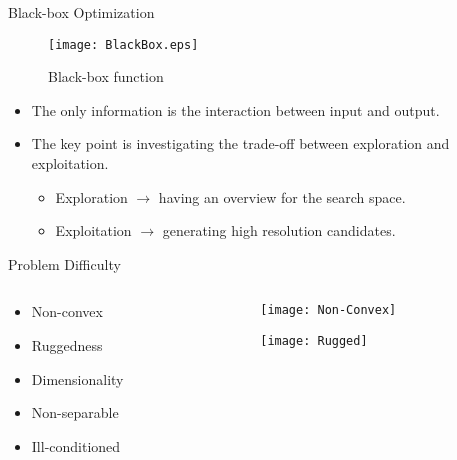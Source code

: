 \begin{frame}{Black-box Optimization}

  \begin{figure}[h]
    \texttt{[image: BlackBox.eps]}
    \caption{Black-box function}  
  \end{figure}
  \begin{itemize}
    \item The only information is the interaction between input and
    output.  
  \item The key point is investigating the trade-off between
    \alert{exploration}
    and \alert{exploitation}.
    \begin{itemize}
      \item Exploration $\rightarrow$ having an overview for the search
        space.
  \item Exploitation $\rightarrow$ generating high resolution
    candidates. 
    \end{itemize}
  \end{itemize}

\end{frame}
\begin{frame}{Problem Difficulty}
  \begin{columns}
    \begin{column}{0.7\textwidth}
      \begin{itemize}
        \item Non-convex
        \item Ruggedness
        \item Dimensionality
        \item Non-separable
        \item Ill-conditioned
      \end{itemize}
    \end{column}
    \begin{column}{0.25\textwidth}
      \begin{minipage}[b]{1\textwidth}
      \texttt{[image: Non-Convex]}
    \end{minipage}
    \begin{minipage}[b]{1\textwidth}  
    \texttt{[image: Rugged]}
  \end{minipage}
    \end{column}
  \end{columns}
\end{frame}

